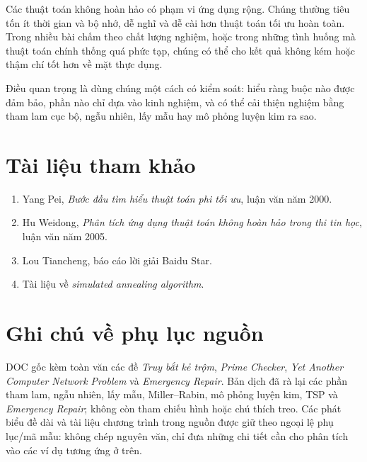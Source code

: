 \documentclass[11pt]{article}
\begin{document}
Các thuật toán không hoàn hảo có phạm vi ứng dụng rộng. Chúng thường tiêu tốn
ít thời gian và bộ nhớ, dễ nghĩ và dễ cài hơn thuật toán tối ưu hoàn toàn.
Trong nhiều bài chấm theo chất lượng nghiệm, hoặc trong những tình huống mà
thuật toán chính thống quá phức tạp, chúng có thể cho kết quả không kém hoặc
thậm chí tốt hơn về mặt thực dụng.

Điều quan trọng là dùng chúng một cách có kiểm soát: hiểu ràng buộc nào được
đảm bảo, phần nào chỉ dựa vào kinh nghiệm, và có thể cải thiện nghiệm bằng
tham lam cục bộ, ngẫu nhiên, lấy mẫu hay mô phỏng luyện kim ra sao.

\section*{Tài liệu tham khảo}

\begin{enumerate}
  \item Yang Pei, \emph{Bước đầu tìm hiểu thuật toán phi tối ưu}, luận văn
  năm 2000.
  \item Hu Weidong, \emph{Phân tích ứng dụng thuật toán không hoàn hảo trong
  thi tin học}, luận văn năm 2005.
  \item Lou Tiancheng, báo cáo lời giải Baidu Star.
  \item Tài liệu về \emph{simulated annealing algorithm}.
\end{enumerate}

\section*{Ghi chú về phụ lục nguồn}

DOC gốc kèm toàn văn các đề \textit{Truy bắt kẻ trộm}, \textit{Prime Checker},
\textit{Yet Another Computer Network Problem} và \textit{Emergency Repair}.
Bản dịch đã rà lại các phần tham lam, ngẫu nhiên, lấy mẫu, Miller--Rabin, mô
phỏng luyện kim, TSP và \textit{Emergency Repair}; không còn tham chiếu hình
hoặc chú thích treo. Các phát biểu đề dài và tài liệu chương trình trong nguồn
được giữ theo ngoại lệ phụ lục/mã mẫu: không chép nguyên văn, chỉ đưa những
chi tiết cần cho phân tích vào các ví dụ tương ứng ở trên.
\end{document}
